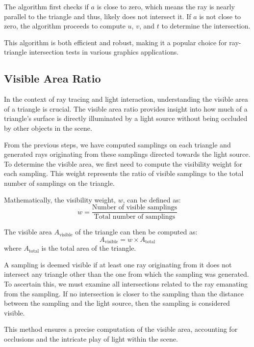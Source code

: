 \documentclass[11pt, a4paper,oneside,chapterprefix=false]{scrbook}
\begin{document}
The algorithm first checks if \( a \) is close to zero, which means the ray is nearly parallel to the triangle and thus, likely does not intersect it. If \( a \) is not close to zero, the algorithm proceeds to compute \( u \), \( v \), and \( t \) to determine the intersection.

This algorithm is both efficient and robust, making it a popular choice for ray-triangle intersection tests in various graphics applications.

\subsection{Visible Area Ratio}

In the context of ray tracing and light interaction, understanding the visible area of a triangle is crucial. The visible area ratio provides insight into how much of a triangle's surface is directly illuminated by a light source without being occluded by other objects in the scene.

From the previous steps, we have computed samplings on each triangle and generated rays originating from these samplings directed towards the light source. To determine the visible area, we first need to compute the visibility weight for each sampling. This weight represents the ratio of visible samplings to the total number of samplings on the triangle.

Mathematically, the visibility weight, \( w \), can be defined as:
\begin{equation}
    w = \frac{\text{Number of visible samplings}}{\text{Total number of samplings}}
\end{equation}

The visible area \( A_{\text{visible}} \) of the triangle can then be computed as:
\begin{equation}
    A_{\text{visible}} = w \times A_{\text{total}}
\end{equation}
where \( A_{\text{total}} \) is the total area of the triangle.

A sampling is deemed visible if at least one ray originating from it does not intersect any triangle other than the one from which the sampling was generated. To ascertain this, we must examine all intersections related to the ray emanating from the sampling. If no intersection is closer to the sampling than the distance between the sampling and the light source, then the sampling is considered visible.

This method ensures a precise computation of the visible area, accounting for occlusions and the intricate play of light within the scene.
 
\end{document}
